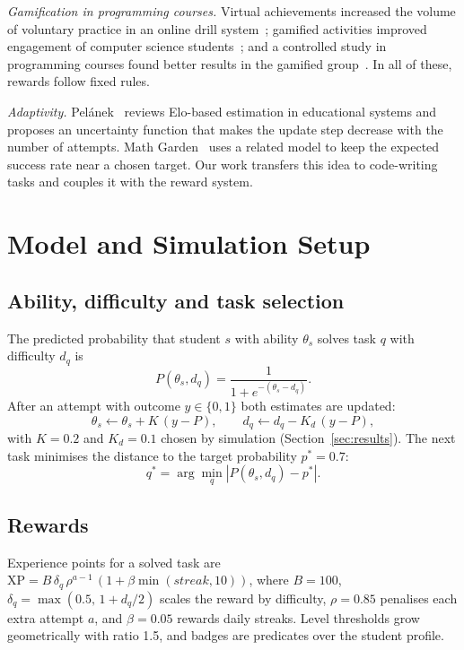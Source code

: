 \documentclass[conference]{IEEEtran}
\begin{document}
\textit{Gamification in programming courses.} Virtual achievements increased the volume of voluntary practice in an online drill system~\cite{denny2013}; gamified activities improved engagement of computer science students~\cite{ibanez2014}; and a controlled study in programming courses found better results in the gamified group~\cite{marin2019}. In all of these, rewards follow fixed rules.

\textit{Adaptivity.} Pelánek~\cite{pelanek2016} reviews Elo-based estimation in educational systems and proposes an uncertainty function that makes the update step decrease with the number of attempts. Math Garden~\cite{klinkenberg2011} uses a related model to keep the expected success rate near a chosen target. Our work transfers this idea to code-writing tasks and couples it with the reward system.

\section{Model and Simulation Setup}
\subsection{Ability, difficulty and task selection}
The predicted probability that student $s$ with ability $\theta_s$ solves task $q$ with difficulty $d_q$ is
\begin{equation}
P(\theta_s, d_q) = \frac{1}{1 + e^{-(\theta_s - d_q)}}.
\label{eq:p}
\end{equation}
After an attempt with outcome $y \in \{0, 1\}$ both estimates are updated:
\begin{equation}
\theta_s \leftarrow \theta_s + K\,(y - P), \qquad d_q \leftarrow d_q - K_d\,(y - P),
\label{eq:elo}
\end{equation}
with $K = 0.2$ and $K_d = 0.1$ chosen by simulation (Section~\ref{sec:results}). The next task minimises the distance to the target probability $p^{*} = 0.7$:
\begin{equation}
q^{*} = \arg\min_q \left| P(\theta_s, d_q) - p^{*} \right|.
\label{eq:select}
\end{equation}

\subsection{Rewards}
Experience points for a solved task are
$\mathrm{XP} = B\,\delta_q\,\rho^{a-1}\,(1 + \beta \min(\mathit{streak}, 10))$, where $B = 100$, $\delta_q = \max(0.5,\, 1 + d_q/2)$ scales the reward by difficulty, $\rho = 0.85$ penalises each extra attempt $a$, and $\beta = 0.05$ rewards daily streaks. Level thresholds grow geometrically with ratio 1.5, and badges are predicates over the student profile.
\end{document}
